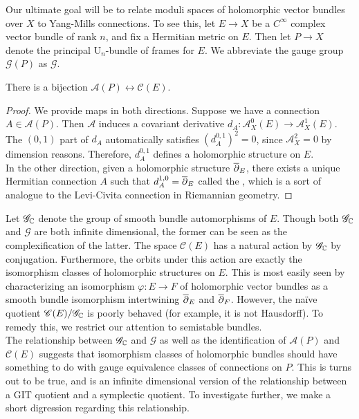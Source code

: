 Our ultimate goal will be to relate moduli spaces of holomorphic vector
bundles over $X$ to Yang-Mills connections. To see this, let $E \to X$ be
a $C^\infty$ complex vector bundle of rank $n$, and fix a Hermitian metric
on $E$. Then let $P \to X$ denote the principal $\mathrm{U}_n$-bundle of frames
for $E$. We abbreviate the gauge group $\mathscr{G}(P)$ as $\mathscr{G}$.
%
\begin{prop}
There is a bijection $\mathscr{A}(P) \leftrightarrow \mathscr{C}(E)$.
\end{prop}
%
\begin{proof}
We provide maps in both directions. Suppose we have a connection
$A \in \mathscr{A}(P)$. Then $\mathcal{A}$ induces a covariant derivative
$d_A : \mathcal{A}^0_X(E) \to \mathcal{A}^1_X(E)$. The $(0,1)$ part of $d_A$
automatically satisfies $(d_A^{0,1})^2 = 0$, since $\mathcal{A}^2_X = 0$ by
dimension reasons. Therefore, $d_A^{0,1}$ defines a holomorphic structure
on $E$. \\

In the other direction, given a holomorphic structure $\overline{\partial}_E$,
there exists a unique Hermitian connection $A$ such that $d_A^{1,0} = \overline{\partial}_E$
called the , which is a sort of analogue to the Levi-Civita
connection in Riemannian geometry.
\end{proof}
%
Let $\mathscr{G}_{\mathbb{C}}$ denote the group of smooth bundle automorphisms of $E$.
Though both $\mathscr{G}_{\mathbb{C}}$ and $\mathscr{G}$ are both infinite dimensional,
the former can be seen as the complexification of the latter. The space
$\mathscr{C}(E)$ has a natural action by $\mathscr{G}_{\mathbb{C}}$ by conjugation.
Furthermore, the orbits under this action are exactly the isomorphism
classes of holomorphic structures on $E$. This is most easily seen by
characterizing an isomorphism $\varphi : E \to F$ of holomorphic vector bundles
as a smooth bundle isomorphism intertwining $\overline{\partial}_E$ and $\overline{\partial}_F$. However,
the na\"ive quotient $\mathscr{C}(E)/\mathscr{G}_{\mathbb{C}}$ is poorly behaved
(for example, it is not Hausdorff). To remedy this, we restrict our attention
to semistable bundles. \\

The relationship between $\mathscr{G}_{\mathbb{C}}$ and $\mathscr{G}$ as well
as the identification of $\mathscr{A}(P)$ and $\mathscr{C}(E)$ suggests
that isomorphism classes of holomorphic bundles should have something to
do with gauge equivalence classes of connections on $P$. This is turns out
to be true, and is an infinite dimensional version of the relationship between
a GIT quotient and a symplectic quotient. To investigate further, we make a short
digression regarding this relationship. \\

